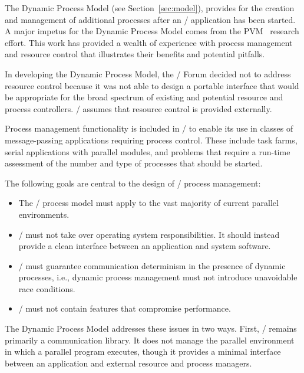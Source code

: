 The Dynamic Process Model (see Section~\ref{sec:model}),
provides for
the creation and management of additional processes
after an \mpi/ application has been started.
A major impetus for
the Dynamic Process Model
comes
from the PVM~\cite{pvmbook} research effort.  This work
has provided a wealth of experience with process
management and resource control that illustrates their benefits
and potential pitfalls.

In developing the Dynamic Process Model, the
\mpi/ Forum decided not to address resource
control because
it was not able to design a portable interface that would be
appropriate for the broad spectrum of existing and potential resource and
process controllers.
\mpi/
assumes that resource control is provided externally.

Process management functionality is included in \MPI/ to enable its use
in classes of message-passing
applications requiring process control. These include task
farms, serial applications with parallel modules, and problems that
require a run-time assessment of the number and type of processes that
should be started.

The following goals are central to the design of \mpi/ process management:

\begin{itemize}

\item The
\mpi/
process model must apply
to the vast majority of current parallel environments.

\item \MPI/ must not take over operating system responsibilities.
It should instead provide a clean interface between an application
and system software.

\item \MPI/ must guarantee communication determinism in the presence of
dynamic processes, i.e.,
dynamic process management must not introduce unavoidable race
conditions.

\item \MPI/ must not contain features that compromise performance.

\end{itemize}

The
Dynamic Process Model
addresses these issues in two
ways. First, \MPI/ remains primarily a communication library. It
does not manage the parallel environment in which
a parallel program executes, though it provides a minimal
interface between an application and external resource and
process managers.

